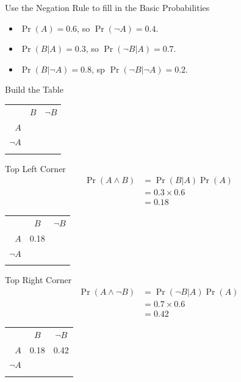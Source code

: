 \documentclass[
  ignorenonframetext,
]{beamer}
\providecommand{\tightlist}{%
  \setlength{\itemsep}{0pt}\setlength{\parskip}{0pt}}
\renewcommand{\,}{\text{, }}
\begin{document}
\begin{frame}{Use the Negation Rule to fill in the Basic Probabilities}
\protect\hypertarget{use-the-negation-rule-to-fill-in-the-basic-probabilities}{}
\begin{itemize}
\tightlist
\item
  \(\Pr(A) = 0.6\), so \(\Pr(\neg A) = 0.4\). \pause
\item
  \(\Pr(B | A) = 0.3\), so \(\Pr(\neg B | A) = 0.7\). \pause
\item
  \(\Pr(B | \neg A) = 0.8\), sp \(\Pr(\neg B | \neg A) = 0.2\).
\end{itemize}
\end{frame}

\begin{frame}{Build the Table}
\protect\hypertarget{build-the-table}{}
\begin{longtable}[]{@{}rcc@{}}
\toprule
& \(B\) & \(\neg B\) \\ \addlinespace
\midrule
\endhead
\(A\) & & \\ \addlinespace
\(\neg A\) & & \\ \addlinespace
\bottomrule
\end{longtable}
\end{frame}

\begin{frame}{Top Left Corner}
\protect\hypertarget{top-left-corner}{}
\begin{align*}
\Pr(A \wedge B) &= \Pr(B | A) \Pr(A) \\
 &= 0.3 \times 0.6 \\
 &= 0.18
\end{align*}

\pause

\begin{longtable}[]{@{}rcc@{}}
\toprule
& \(B\) & \(\neg B\) \\ \addlinespace
\midrule
\endhead
\(A\) & 0.18 & \\ \addlinespace
\(\neg A\) & & \\ \addlinespace
\bottomrule
\end{longtable}
\end{frame}

\begin{frame}{Top Right Corner}
\protect\hypertarget{top-right-corner}{}
\begin{align*}
\Pr(A \wedge \neg B) &= \Pr(\neg B | A) \Pr(A) \\
 &= 0.7 \times 0.6 \\
 &= 0.42
\end{align*}

\pause

\begin{longtable}[]{@{}rcc@{}}
\toprule
& \(B\) & \(\neg B\) \\ \addlinespace
\midrule
\endhead
\(A\) & 0.18 & 0.42 \\ \addlinespace
\(\neg A\) & & \\ \addlinespace
\bottomrule
\end{longtable}
\end{frame}
\end{document}
